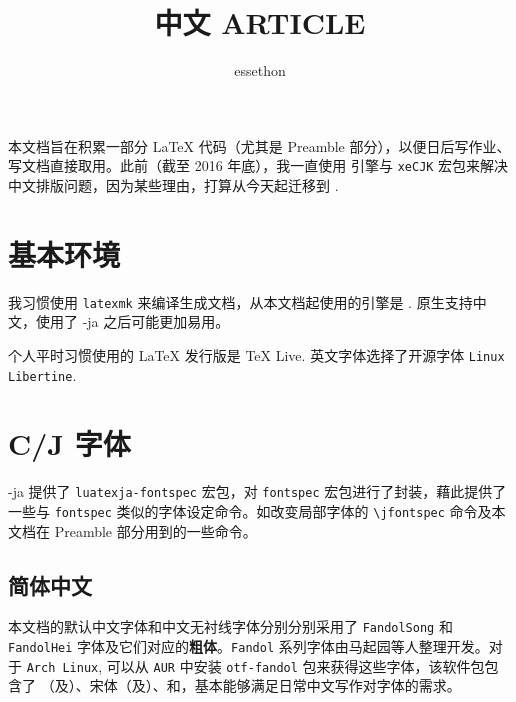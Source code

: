 \documentclass[a4paper]{scrartcl}
\title{中文 ARTICLE}
\author{essethon}
\begin{document}
\maketitle

本文档旨在积累一部分 \LaTeX{} 代码（尤其是 Preamble 部分），以便日后写作业、写文档直接取用。此前（截至 2016 年底），我一直使用  引擎与 \verb|xeCJK| 宏包来解决中文排版问题，因为某些理由，打算从今天起迁移到 . 

\section{基本环境}\label{sec:ji_ben_huan_jing_}
我习惯使用 \texttt{latexmk} 来编译生成文档，从本文档起使用的引擎是 .  原生支持中文，使用了 -ja 之后可能更加易用。

个人平时习惯使用的 \LaTeX{} 发行版是 \TeX{} Live. 英文字体选择了开源字体 \texttt{Linux Libertine}.
  
\section{C/J 字体}\label{sec:zhong_wen_zi_ti_}
-ja 提供了 \texttt{luatexja-fontspec} 宏包，对 \texttt{fontspec} 宏包进行了封装，藉此提供了一些与 \texttt{fontspec} 类似的字体设定命令。如改变局部字体的 \verb|\jfontspec| 命令及本文档在 Preamble 部分用到的一些命令。
\subsection{简体中文}
本文档的默认中文字体和中文无衬线字体分别分别采用了 \verb|FandolSong| 和 \verb|FandolHei| 字体及它们对应的\textbf{粗体}。\verb|Fandol| 系列字体由马起园等人整理开发。对于 \verb|Arch Linux|, 可以从 \verb|AUR| 中安装 \verb|otf-fandol| 包来获得这些字体，该软件包包含了 {（及{}）}、宋体（及{}）、{}和{}，基本能够满足日常中文写作对字体的需求。
\end{document}

